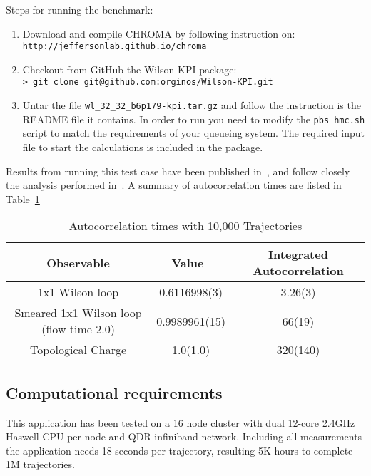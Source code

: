 \documentclass[11pt,a4paper]{article}
\begin{document}
\noindent
Steps for running the benchmark:
\begin{enumerate}
\item	 Download and compile CHROMA by following instruction on:\\
{\tt http://jeffersonlab.github.io/chroma }
\item Checkout from GitHub the Wilson KPI package:\\
	{\tt > git clone git@github.com:orginos/Wilson-KPI.git}
\item Untar the file {\tt wl\_32\_32\_b6p179-kpi.tar.gz} and follow the instruction is the README file it contains. In order to run you need to modify the {\tt pbs\_hmc.sh} script to match the requirements of your queueing system. The required input file to start the calculations is included in the package.
\end{enumerate}

Results from running this test case have been published in~\cite{Gambhir:2015nda},
and follow closely the analysis performed in~\cite{Schaefer:2010hu}. A summary of autocorrelation times are listed in Table~\ref{tab:auto}
\begin{table}[!ht]
\caption{\label{tab:auto}Autocorrelation times with 10,000 Trajectories} %
{\centering  
\begin{tabular}{c c c} 
\hline\hline %
Observable & Value\ & Integrated Autocorrelation \\ [0.5ex] %
\hline %
 1x1 Wilson loop &  0.6116998(3) & 3.26(3) \\
Smeared 1x1 Wilson loop (flow time 2.0)  &  0.9989961(15) & 66(19) \\  
Topological Charge &1.0(1.0) & 320(140) \\ 
\hline %
\end{tabular} 
}
\end{table}



\subsection{Computational requirements}
 This application has been tested on a 16 node cluster with dual 12-core 2.4GHz Haswell CPU per node and QDR infiniband network. Including all measurements the application needs 18 seconds per trajectory, resulting 5K hours to complete 1M trajectories.
 



\end{document}

